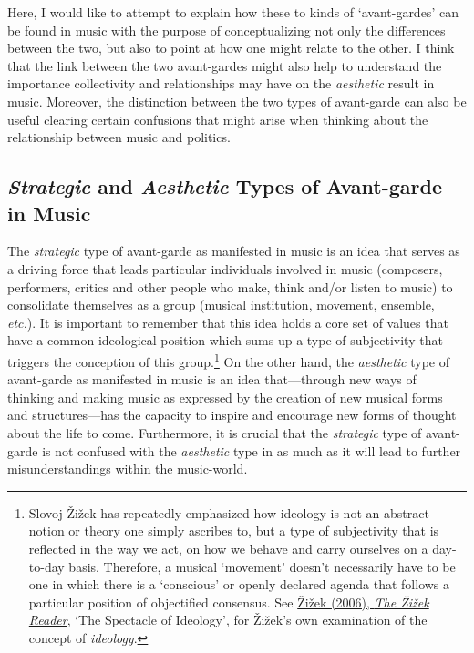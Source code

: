 Here, I would like to attempt to explain how these to kinds of `avant-gardes' can be found in music with the purpose of conceptualizing not only the differences between the two, but also to point at how one might relate to the other. I think that the link between the two avant-gardes might also help to understand the importance collectivity and relationships may have on the \emph{aesthetic} result in music. Moreover, the distinction between the two types of avant-garde can also be useful clearing certain confusions that might arise when thinking about the relationship between music and politics.  

\subsection{\emph{Strategic} and \emph{Aesthetic} Types of Avant-garde in Music}

The \emph{strategic} type of avant-garde as manifested in music is an idea that serves as a driving force that leads particular individuals involved in music (composers, performers, critics and other people who make, think and/or listen to music) to consolidate themselves as a group (musical institution, movement, ensemble, \emph{etc.}). It is important to remember that this idea holds a core set of values that have a common ideological position which sums up a type of subjectivity that triggers the conception of this group.\footnote{Slovoj \v{Z}i\v{z}ek has repeatedly emphasized how ideology is not an abstract notion or theory one simply ascribes to, but a type of subjectivity that is reflected in the way we act, on how we behave and carry ourselves on a day-to-day basis. Therefore, a musical `movement' doesn't necessarily have to be one in which there is a `conscious' or openly declared agenda that follows a particular position of objectified consensus. See \hyperlink{zizekreader}{\v{Z}i\v{z}ek (2006), \emph{The \v{Z}i\v{z}ek Reader}}, `The Spectacle of Ideology', for \v{Z}i\v{z}ek's own examination of the concept of \emph{ideology}.} On the other hand,  the \emph{aesthetic} type of avant-garde as manifested in music is an idea that---through new ways of thinking and making music as expressed by the creation of new musical forms and structures---has the capacity to inspire and encourage new forms of thought about the life to come.  Furthermore, it is crucial that the \emph{strategic} type of avant-garde is not confused with the \emph{aesthetic} type in as much as it will lead to further misunderstandings within the music-world. 

